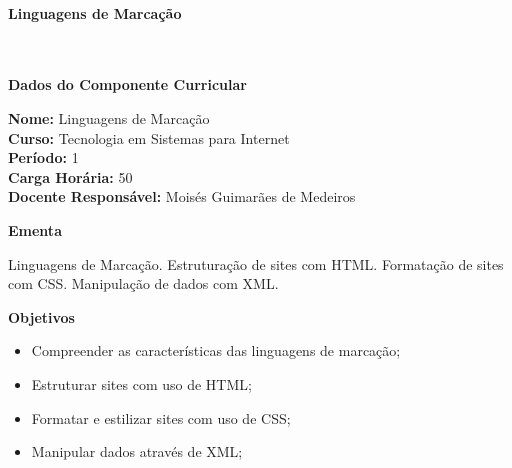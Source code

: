 \paragraph{Linguagens de Marcação} \


\begin{snugshade}\begin{center}\textbf{
    Dados do Componente Curricular
}\end{center}\end{snugshade}

\noindent \textbf{Nome:}                Linguagens de Marcação
\\        \textbf{Curso:}               Tecnologia em Sistemas para Internet
\\        \textbf{Período:}             \unit{1}{\degree}
\\        \textbf{Carga Horária:}       \unit{50}{\hour}
\\        \textbf{Docente Responsável:} Moisés Guimarães de Medeiros


\begin{snugshade}\begin{center}\textbf{
    Ementa
\vphantom{q}}\end{center}\end{snugshade}

\noindent
Linguagens de Marcação. Estruturação de sites com HTML. Formatação de sites com CSS. Manipulação de dados com XML.


\begin{snugshade}\begin{center}\textbf{
    Objetivos
}\end{center}\end{snugshade}

\begin{itemize}

\item Compreender as características das linguagens de marcação;

\item Estruturar sites com uso de HTML;

\item Formatar e estilizar sites com uso de CSS;

\item Manipular dados através de XML;

\end{itemize} 

